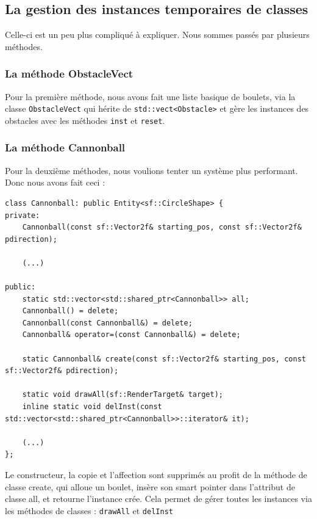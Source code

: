 \documentclass[a4paper,12pt]{article}
\begin{document}
\subsection{La gestion des instances temporaires de classes}
    Celle-ci est un peu plus compliqué à expliquer. Nous sommes passés par plusieurs méthodes.
\subsubsection{La méthode ObstacleVect}
Pour la première méthode, nous avons fait une liste basique de boulets, via la classe
\texttt{ObstacleVect} qui hérite de \texttt{std::vect\textless Obstacle\textgreater}
et gère les instances des obstacles avec les méthodes \texttt{inst} et \texttt{reset}. 
\subsubsection{La méthode Cannonball}
Pour la deuxième méthodes, nous voulions tenter un système plus performant. Donc nous avons fait ceci :
    \begin{lstlisting}
class Cannonball: public Entity<sf::CircleShape> {
private:
    Cannonball(const sf::Vector2f& starting_pos, const sf::Vector2f& pdirection);

    (...)

public:
    static std::vector<std::shared_ptr<Cannonball>> all;
    Cannonball() = delete;
    Cannonball(const Cannonball&) = delete;
    Cannonball& operator=(const Cannonball&) = delete;

    static Cannonball& create(const sf::Vector2f& starting_pos, const sf::Vector2f& pdirection);

    static void drawAll(sf::RenderTarget& target);
    inline static void delInst(const std::vector<std::shared_ptr<Cannonball>>::iterator& it);

    (...)
};
    \end{lstlisting}
    Le constructeur, la copie et l'affection sont supprimés au profit
    de la méthode de classe create, qui alloue un boulet, insère son smart pointer dans l'attribut
    de classe all, et retourne l'instance crée.
    Cela permet de gérer toutes les instances via les méthodes de classes :
    \texttt{drawAll} et \texttt{delInst}
\end{document}
